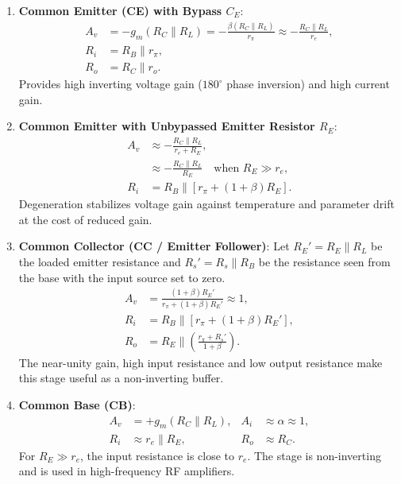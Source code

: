 \documentclass[12pt,a4paper]{article}
\begin{document}
\begin{tcolorbox}[formulabox, title={Analytical Small-Signal Expressions for BJT Amplifiers}, title after break={BJT Amplifier Expressions (contd.)}]
\begin{enumerate}[leftmargin=1.8em, itemsep=8pt]
  \item \textbf{Common Emitter (CE) with Bypass $C_E$}:
  \[
  \begin{aligned}
  A_v &= -g_m (R_C \parallel R_L)
       = -\frac{\beta (R_C \parallel R_L)}{r_\pi}
       \approx -\frac{R_C \parallel R_L}{r_e}, \\[3pt]
  R_i &= R_B \parallel r_\pi, \\[3pt]
  R_o &= R_C \parallel r_o.
  \end{aligned}
  \]
  Provides high inverting voltage gain ($180^\circ$ phase inversion) and high current gain.
  \item \textbf{Common Emitter with Unbypassed Emitter Resistor $R_E$}:
  \[
  \begin{aligned}
  A_v &\approx -\frac{R_C \parallel R_L}{r_e + R_E}, \\[3pt]
      &\approx -\frac{R_C \parallel R_L}{R_E}
        \quad \text{when } R_E \gg r_e, \\[3pt]
  R_i &= R_B \parallel \left[r_\pi + (1+\beta)R_E\right].
  \end{aligned}
  \]
  Degeneration stabilizes voltage gain against temperature and parameter drift at the cost of reduced gain.
  \item \textbf{Common Collector (CC / Emitter Follower)}:
  Let $R_E' = R_E \parallel R_L$ be the loaded emitter resistance and
  $R_s' = R_s \parallel R_B$ be the resistance seen from the base with
  the input source set to zero.
  \[
  \begin{aligned}
  A_v &= \frac{(1+\beta)R_E'}{r_\pi + (1+\beta)R_E'} \approx 1, \\[3pt]
  R_i &= R_B \parallel \left[r_\pi + (1+\beta)R_E'\right], \\[3pt]
  R_o &= R_E \parallel \left(\frac{r_\pi + R_s'}{1+\beta}\right).
  \end{aligned}
  \]
  The near-unity gain, high input resistance and low output resistance
  make this stage useful as a non-inverting buffer.
  \item \textbf{Common Base (CB)}:
  \[
  \begin{aligned}
  A_v &= +g_m (R_C \parallel R_L), & A_i &\approx \alpha \approx 1, \\[3pt]
  R_i &\approx r_e \parallel R_E, & R_o &\approx R_C.
  \end{aligned}
  \]
  For $R_E \gg r_e$, the input resistance is close to $r_e$.
  The stage is non-inverting and is used in high-frequency RF amplifiers.
\end{enumerate}
\end{tcolorbox}
\end{document}
